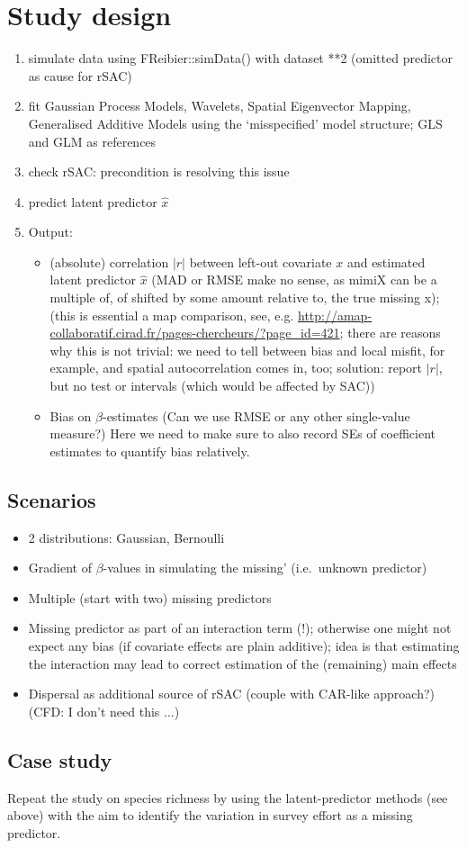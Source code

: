 \documentclass[11pt]{article}
\begin{document}
\section{Study design}
\begin{enumerate}
	\item simulate data using FReibier::simData() with dataset **2 (omitted predictor as cause for rSAC)
	\item fit Gaussian Process Models, Wavelets, Spatial Eigenvector Mapping, Generalised Additive Models using the `misspecified' model structure; GLS and GLM as references
	\item check rSAC: precondition is resolving this issue
	\item predict latent predictor $\hat{x}$
	\item Output:
	\begin{itemize}
		\item (absolute) correlation $|r|$ between left-out covariate $x$ and estimated latent predictor $\hat{x}$ (MAD or RMSE make no sense, as mimiX can be a multiple of, of shifted by some amount relative to, the true missing x); (this is essential a map comparison, see, e.g. \url{http://amap-collaboratif.cirad.fr/pages-chercheurs/?page_id=421}; there are reasons why this is not trivial: we need to tell between bias and local misfit, for example, and spatial autocorrelation comes in, too; solution: report $|r|$, but no test or intervals (which would be affected by SAC))
		\item Bias on $\beta$-estimates (Can we use RMSE or any other single-value measure?) Here we need to make sure to also record SEs of coefficient estimates to quantify bias relatively.
	\end{itemize}
\end{enumerate}

\subsection{Scenarios}
\begin{itemize}
	\item 2 distributions: Gaussian, Bernoulli
	\item Gradient of $\beta$-values in simulating the missing' (i.e.~unknown predictor)
	\item Multiple (start with two) missing predictors
	\item Missing predictor as part of an interaction term (!); otherwise one might not expect any bias (if covariate effects are plain additive); idea is that estimating the interaction may lead to correct estimation of the (remaining) main effects
	\item Dispersal as additional source of rSAC (couple with CAR-like approach?) (CFD: I don't need this ...)
\end{itemize}

\subsection{Case study}
Repeat the study on species richness by \citet{Mahecha2008} using the latent-predictor methods (see above) with the aim to identify the variation in survey effort as a missing predictor. 

 

\end{document}
